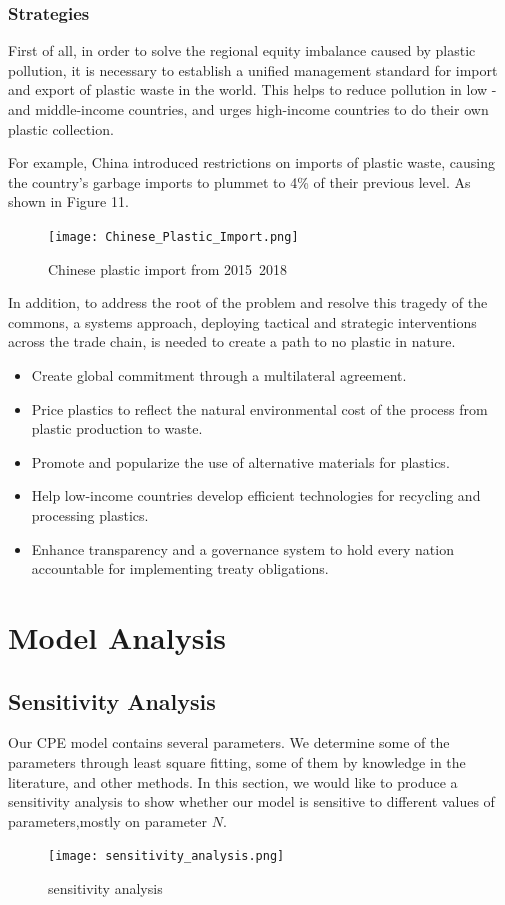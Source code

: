 \documentclass{mcmthesis}
\begin{document}
 \subsubsection{Strategies}
   First of all, in order to solve the regional equity imbalance caused by plastic pollution, it is necessary to establish a unified management standard for import and export of plastic waste in the world. This helps to reduce pollution in low - and middle-income countries, and urges high-income countries to do their own plastic collection.

   For example, China introduced restrictions on imports of plastic waste, causing the country's garbage imports to plummet to 4\% of their previous level. As shown in Figure 11.
   \begin{figure}[H]
    \centering
     \texttt{[image: Chinese\_Plastic\_Import.png]}
	\caption{Chinese plastic import from 2015~2018}
   \end{figure}

   In addition, to address the root of the problem and resolve this tragedy of the commons, a systems approach, deploying tactical and strategic interventions across the trade chain, is needed to create a path to no plastic in nature.
   \begin{itemize}
    \item Create global commitment through a multilateral agreement.
    \item Price plastics to reflect the natural environmental cost of the process from plastic production to waste.
    \item Promote and popularize the use of alternative materials for plastics.
    \item Help low-income countries develop efficient technologies for recycling and processing plastics.
    \item Enhance transparency and a governance system to hold every nation accountable for implementing treaty obligations.
\end{itemize}


\section{Model Analysis}
\subsection{Sensitivity Analysis}
Our CPE model contains several parameters. We determine some of the parameters through least square fitting, some of them by knowledge in the literature, and other methods. In this section,
we would like to produce a sensitivity analysis to show whether our model is sensitive to different
values of parameters,mostly on parameter $N$. 
\begin{figure}[H]
    \centering
     \texttt{[image: sensitivity\_analysis.png]}
	\caption{sensitivity analysis}
   \end{figure}
\end{document}

